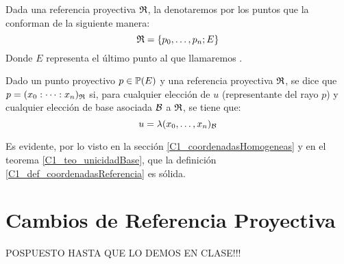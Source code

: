 Dada una referencia proyectiva $\mathfrak{R}$, la denotaremos por los puntos que la conforman de la siguiente manera:
\begin{equation}
\label{C1_eq_notacionReferencias}
\mathfrak{R}=\{p_0,\dots,p_n;E\}
\end{equation}
Donde $E$ representa el último punto al que llamaremos .
\begin{defi}
	\label{C1_def_coordenadasReferencia}
	Dado un punto proyectivo $p\in\mathbb{P}(E)$ y una referencia proyectiva $\mathfrak{R}$, se dice que $p=(x_0:\dots :x_n)_{\mathfrak{R}}$ si, para cualquier elección de $u$ (representante del rayo $p$) y cualquier elección de base asociada $\mathcal{B}$ a $\mathfrak{R}$, se tiene que:
	\[u=\lambda(x_0,\dots,x_n)_{\mathcal{B}}\]
\end{defi}
Es evidente, por lo visto en la sección \ref{C1_coordenadasHomogeneas} y en el teorema \ref{C1_teo_unicidadBase}, que la definición \ref{C1_def_coordenadasReferencia} es sólida.
\section{Cambios de Referencia Proyectiva}
POSPUESTO HASTA QUE LO DEMOS EN CLASE!!!